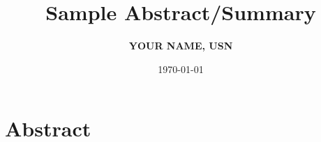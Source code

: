 \documentclass[12pt, a4paper]{article}
\begin{document}
\title{\huge{\textbf{Sample Abstract/Summary}}}
\author{\large{\textbf{YOUR NAME, USN}}}
\date{\today}
\maketitle	
\section{Abstract}	
\hspace{0.5cm}
\lipsum[1]
\vspace{0.5cm}	

\lipsum[3]	
\end{document}
